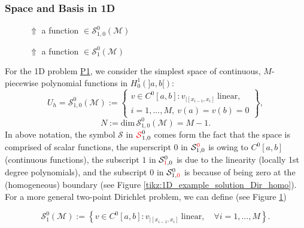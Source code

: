 	\subsubsection{Space and Basis in 1D}\label{subsubsection.2.1.3}
	\begin{figure}[!htbp]
		\centering
		\begin{minipage}{.5\textwidth}
		\centering
		
		\caption{$\Uparrow$ a function $\in\mathcal{S}_{1,0}^{0}(\mathcal{M})$}
		\label{tikz:1D_example_solution_Dir_homo}
		\end{minipage}%
		\begin{minipage}{.5\textwidth}
		\centering
		
		\caption{$\Uparrow$ a function $\in \mathcal{S}_{1}^{0}(\mathcal{M})$}
		\label{tikz:1D_example_solution_Dir_inhomo}
		\end{minipage}
	\end{figure}
	For the 1D problem \hyperlink{P1}{P1}, we consider the simplest space of 
	continuous, $M$-piecewise polynomial functions in $H_0^1(]a,b[)$:
	\begin{equation}\label{def:1D S_10^0(M) space}
	U_h=\mathcal{S}_{1,0}^{0}(\mathcal{M}) := \left\{
	\begin{array}{l}
	v\in C^0{[a,b]}: v_{|[x_{i-1},x_i]}\ \textrm{linear},\\
	i=1,...,M,\ v(a)=v(b)=0
	\end{array}\right\},
	\end{equation}
	\[ N:=\mathrm{dim}\,\mathcal{S}_{1,0}^{0}(\mathcal{M})=M-1. \]	
	In above notation, the symbol $\mathcal{S}$ in 
	$\mathcal{\textcolor{red}{S}}_{1,0}^{0}$
	comes form the fact that the space 
	is comprised of scalar functions, the superscript $0$ in $ 
	\mathcal{S}_{1,0}^{\textcolor{red}{0}}$ is owing to $C^0[a,b]$
	 (continuous functions), the subscript $1$ 
	in  $\mathcal{S}_{\textcolor{red}{1},0}^{0}$ is due to the linearity 
	(locally 1st degree polynomials), 
	and the subscript $0$ in $\mathcal{S}_{1,\textcolor{red}{0}}^{0}$ is 
	because of being zero at the (homogeneous) boundary (see Figure 
	\ref{tikz:1D_example_solution_Dir_homo}). For a more general 
	two-point Dirichlet problem, we can define (see Figure 
	\ref{tikz:1D_example_solution_Dir_inhomo})
	
	\begin{equation}\label{def:1D S_1^0(M) space}
	\mathcal{S}_{1}^{0}(\mathcal{M}):=\left\{
		v\in C^0{[a,b]}: v_{|[x_{i-1},x_i]}\ \textrm{linear},\quad
			\forall i=1,...,M\right\}.
	\end{equation}
	

